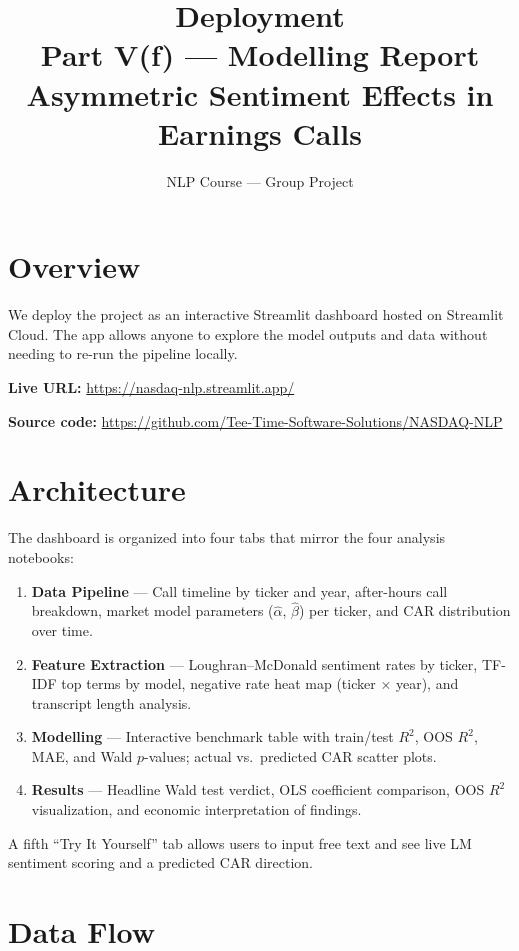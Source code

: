 \documentclass[12pt,a4paper]{article}
\title{\textbf{Deployment}\\[0.3em]
\large Part V(f) --- Modelling Report\\
Asymmetric Sentiment Effects in Earnings Calls}
\author{NLP Course --- Group Project}
\date{}
\begin{document}
\maketitle

\section{Overview}

We deploy the project as an interactive Streamlit dashboard hosted on Streamlit Cloud.
The app allows anyone to explore the model outputs and data without needing to
re-run the pipeline locally.

\textbf{Live URL:}
\url{https://nasdaq-nlp.streamlit.app/}

\textbf{Source code:}
\url{https://github.com/Tee-Time-Software-Solutions/NASDAQ-NLP}

\section{Architecture}

The dashboard is organized into four tabs that mirror the four analysis notebooks:

\begin{enumerate}
  \item \textbf{Data Pipeline} --- Call timeline by ticker and year,
        after-hours call breakdown, market model parameters ($\hat\alpha$, $\hat\beta$)
        per ticker, and CAR distribution over time.

  \item \textbf{Feature Extraction} --- Loughran--McDonald sentiment rates by ticker,
        TF-IDF top terms by model, negative rate heat map (ticker $\times$ year),
        and transcript length analysis.

  \item \textbf{Modelling} --- Interactive benchmark table with train/test $R^2$,
        OOS $R^2$, MAE, and Wald $p$-values; actual vs.\ predicted CAR scatter plots.

  \item \textbf{Results} --- Headline Wald test verdict, OLS coefficient comparison,
        OOS $R^2$ visualization, and economic interpretation of findings.
\end{enumerate}

A fifth ``Try It Yourself'' tab allows users to input free text and see live LM
sentiment scoring and a predicted CAR direction.

\section{Data Flow}
\end{document}
